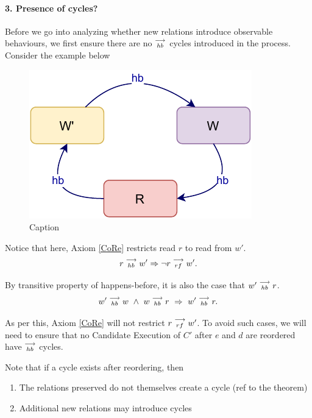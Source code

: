 
\paragraph{3. Presence of cycles?}
    Before we go into analyzing whether new relations introduce observable behaviours, we first ensure there are no $\stackrel{\longrightarrow}{_\textit{hb}}$ cycles introduced in the process. Consider the example below
    \begin{figure}[H]
        \centering
        \includegraphics[scale=0.7]{InstructionReordering/ValidReorderingProof/ProofParts/Part3/part3(a).pdf}
        \caption{Caption}
        \label{fig:my_label}
    \end{figure}


    Notice that here, Axiom \ref{CoRe} restricts read $r$ to read from $w'$.
    \[
        r\stackrel{\longrightarrow}{_{hb}}w' \Rightarrow \neg r\stackrel{\longrightarrow}{_{rf}}w'.
    \]

    By transitive property of happens-before, it is also the case that $w'\stackrel{\longrightarrow}{_{hb}}r$. 
    \[
        \reln{w'}{hb}{w} \ \wedge \ \reln{w}{hb}{r} \ 
        \Rightarrow \ 
        \reln{w'}{hb}{r}.
    \]

    As per this, Axiom \ref{CoRe} will not restrict $r\stackrel{\longrightarrow}{_{rf}}w'$. To avoid such cases, we will need to ensure that no Candidate Execution of $C'$ after $e$ and $d$ are reordered have $\stackrel{\longrightarrow}{_{hb}}$ cycles.

    Note that if a cycle exists after reordering, then 
    \begin{enumerate}
        \item The relations preserved do not themselves create a cycle (ref to the theorem)
        \item Additional new relations may introduce cycles
    \end{enumerate}

